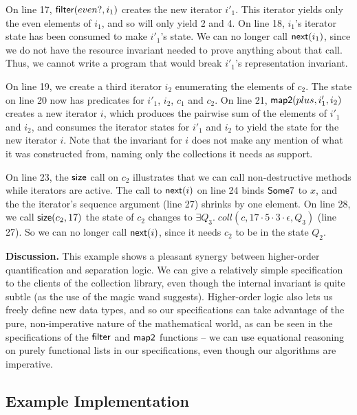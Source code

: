 On line 17, $\mathsf{filter}(even?, i_1)$ creates the new iterator
$i'_1$. This iterator yields only the even elements of $i_1$, and so
will only yield 2 and 4. On line 18, $i_1$'s iterator state has been
consumed to make $i'_1$'s state. We can no longer call
$\mathsf{next}(i_1)$, since we do not have the resource invariant
needed to prove anything about that call. Thus, we cannot write a
program that would break $i'_1$'s representation invariant.

On line 19, we create a third iterator $i_2$ enumerating the elements
of $c_2$. The state on line 20 now has predicates for $i'_1$, $i_2$,
$c_1$ and $c_2$. On line 21, $\mathsf{map2}(plus, i'_1, i_2)$ creates a
new iterator $i$, which produces the pairwise sum of the elements of
$i'_1$ and $i_2$, and consumes the iterator states for $i'_1$ and
$i_2$ to yield the state for the new iterator $i$. Note that the 
invariant for $i$ does not make any mention of what it was constructed
from, naming only the collections it needs as support. 

On line 23, the $\mathsf{size}$ call on $c_2$ illustrates that we can
call non-destructive methods while iterators are active. The call to
$\mathsf{next}(i)$ on line 24 binds $\mathsf{Some }7$ to $x$, and the
the iterator's sequence argument (line 27) shrinks by one element. On
line 28, we call $\mathsf{size}(c_2, 17)$ the state of $c_2$ changes to
$\exists Q_3.\; coll(c, 17\cdot 5 \cdot 3\cdot\epsilon, Q_3)$ (line
27). So we can no longer call $\mathsf{next}(i)$, since it needs $c_2$
to be in the state $Q_2$.

\textbf{Discussion.} This example shows a pleasant synergy between
higher-order quantification and separation logic. We can give a
relatively simple specification to the clients of the collection
library, even though the internal invariant is quite subtle (as the
use of the magic wand suggests). Higher-order logic also lets us
freely define new data types, and so our specifications can take
advantage of the pure, non-imperative nature of the mathematical
world, as can be seen in the specifications of the $\mathsf{filter}$
and $\mathsf{map2}$ functions -- we can use equational reasoning on
purely functional lists in our specifications, even though our
algorithms are imperative.


\subsection{Example Implementation}

